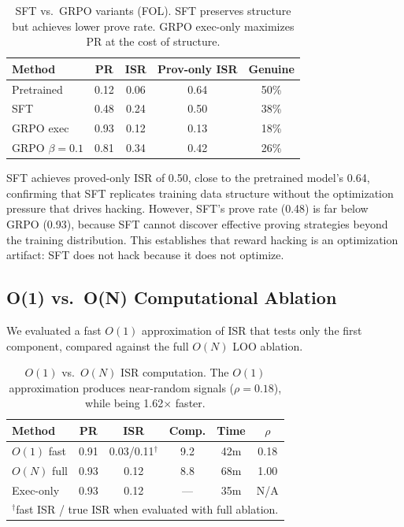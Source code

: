 \documentclass[11pt,twocolumn]{article}
\newcommand{\isr}{\textsc{ISR}}
\newcommand{\pr}{\textsc{PR}}
\newcommand{\grpo}{\textsc{GRPO}}
\begin{document}
\begin{table}[h]
\centering
\caption{SFT vs.\ \grpo{} variants (FOL). SFT preserves structure but achieves lower prove rate. \grpo{} exec-only maximizes \pr{} at the cost of structure.}
\label{tab:sft}
\small
\begin{tabular}{@{}lcccc@{}}
\toprule
Method & \pr{} & \isr{} & Prov-only \isr{} & Genuine \\
\midrule
Pretrained & 0.12 & 0.06 & 0.64 & 50\% \\
SFT & 0.48 & 0.24 & 0.50 & 38\% \\
\grpo{} exec & 0.93 & 0.12 & 0.13 & 18\% \\
\grpo{} $\beta{=}0.1$ & 0.81 & 0.34 & 0.42 & 26\% \\
\bottomrule
\end{tabular}
\end{table}

SFT achieves proved-only \isr{} of 0.50, close to the pretrained model's 0.64, confirming that SFT replicates training data structure without the optimization pressure that drives hacking.
However, SFT's prove rate (0.48) is far below \grpo{} (0.93), because SFT cannot discover effective proving strategies beyond the training distribution.
This establishes that reward hacking is an optimization artifact: SFT does not hack because it does not optimize.

\subsection{O(1) vs.\ O(N) Computational Ablation}
\label{sec:o1_ablation}

We evaluated a fast $O(1)$ approximation of \isr{} that tests only the first component, compared against the full $O(N)$ LOO ablation.

\begin{table}[h]
\centering
\caption{$O(1)$ vs.\ $O(N)$ \isr{} computation. The $O(1)$ approximation produces near-random signals ($\rho{=}0.18$), while being 1.62$\times$ faster.}
\label{tab:o1}
\small
\begin{tabular}{@{}lccccc@{}}
\toprule
Method & \pr{} & \isr{} & Comp. & Time & $\rho$ \\
\midrule
$O(1)$ fast & 0.91 & 0.03/0.11$^\dagger$ & 9.2 & 42m & 0.18 \\
$O(N)$ full & 0.93 & 0.12 & 8.8 & 68m & 1.00 \\
Exec-only & 0.93 & 0.12 & --- & 35m & N/A \\
\bottomrule
\multicolumn{6}{l}{\footnotesize $^\dagger$fast \isr{} / true \isr{} when evaluated with full ablation.}
\end{tabular}
\end{table}
\end{document}
